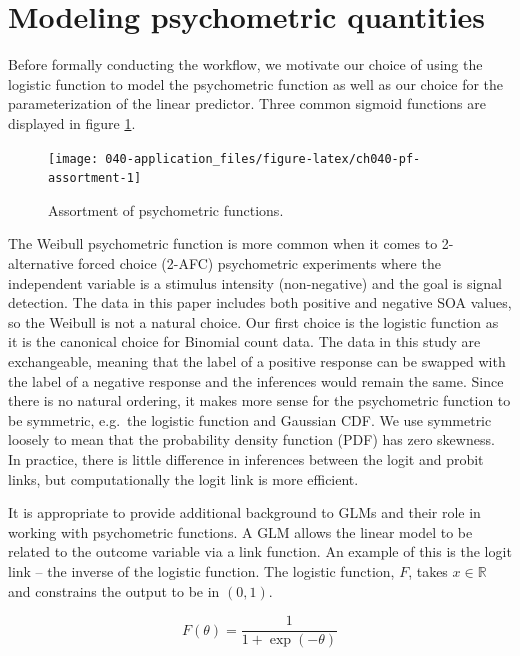 \documentclass[11pt, oneside, openany]{scrbook}
\begin{document}
\hypertarget{psych-quant}{%
\section{Modeling psychometric quantities}\label{psych-quant}}

Before formally conducting the workflow, we motivate our choice of using the logistic function to model the psychometric function as well as our choice for the parameterization of the linear predictor. Three common sigmoid functions are displayed in figure \ref{fig:ch040-pf-assortment}.

\begin{figure}

{\centering \texttt{[image: 040-application\_files/figure-latex/ch040-pf-assortment-1]} 

}

\caption{Assortment of psychometric functions.}\label{fig:ch040-pf-assortment}
\end{figure}

The Weibull psychometric function is more common when it comes to 2-alternative forced choice (2-AFC) psychometric experiments where the independent variable is a stimulus intensity (non-negative) and the goal is signal detection. The data in this paper includes both positive and negative SOA values, so the Weibull is not a natural choice. Our first choice is the logistic function as it is the canonical choice for Binomial count data. The data in this study are exchangeable, meaning that the label of a positive response can be swapped with the label of a negative response and the inferences would remain the same. Since there is no natural ordering, it makes more sense for the psychometric function to be symmetric, e.g.~the logistic function and Gaussian CDF. We use symmetric loosely to mean that the probability density function (PDF) has zero skewness. In practice, there is little difference in inferences between the logit and probit links, but computationally the logit link is more efficient.

It is appropriate to provide additional background to GLMs and their role in working with psychometric functions. A GLM allows the linear model to be related to the outcome variable via a link function. An example of this is the logit link -- the inverse of the logistic function. The logistic function, \(F\), takes \(x \in \mathbb{R}\) and constrains the output to be in \((0, 1)\).

\begin{equation}
  F(\theta) = \frac{1}{1 + \exp\left(-\theta\right)}
  \label{eq:logistic}
\end{equation}
\end{document}
